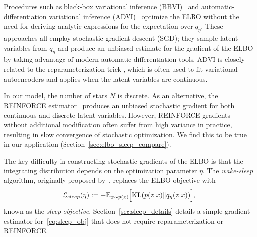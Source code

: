 
Procedures such as black-box variational inference (BBVI)~\citep{ranganath2013black} and 
automatic-differentiation variational inference (ADVI)~\citep{kucukelbir2016automatic}
optimize the ELBO  without the need for 
deriving analytic expressions for the expectation over $q_\eta$.  
These approaches all employ stochastic gradient descent (SGD); 
they sample latent variables from $q_\eta$ and produce an unbiased estimate for the gradient of the ELBO by taking advantage of modern automatic differentiation tools. 
ADVI is closely related to the reparameterization trick \citep{kingma2013autoencoding, rezende2014stochastic}, which is often used to fit variational autoencoders and applies when the latent variables are continuous. 

In our model, the number of stars $N$ is discrete.
As an alternative, the REINFORCE estimator~\citep{Williams1992reinforce} produces an unbiased stochastic gradient for both continuous and discrete latent variables.
However, REINFORCE gradients without additional modification often suffer from high variance in practice, resulting in slow convergence of stochastic optimization. We find this to be true in our application (Section~\ref{sec:elbo_sleep_compare}). 

The key difficulty in constructing stochastic gradients of the ELBO is that the integrating distribution depends on the optimization parameter $\eta$. 
The {\itshape wake-sleep} algorithm, originally proposed by~\cite{Hinton1995wake_sleep}, replaces the 
ELBO objective with 
\begin{align}
    \mathcal{L}_{sleep}(\eta) := 
    - \mathbb{E}_{x \sim p(x)}\Big[\textrm{KL}(p(z | x) \| q_\eta(z | x))\Big]
    \label{eq:sleep_obj},
\end{align}
known as the {\itshape sleep objective}.  Section~\ref{sec:sleep_details} details a simple gradient estimator for~\eqref{eq:sleep_obj} that does not require reparameterization or REINFORCE. 

